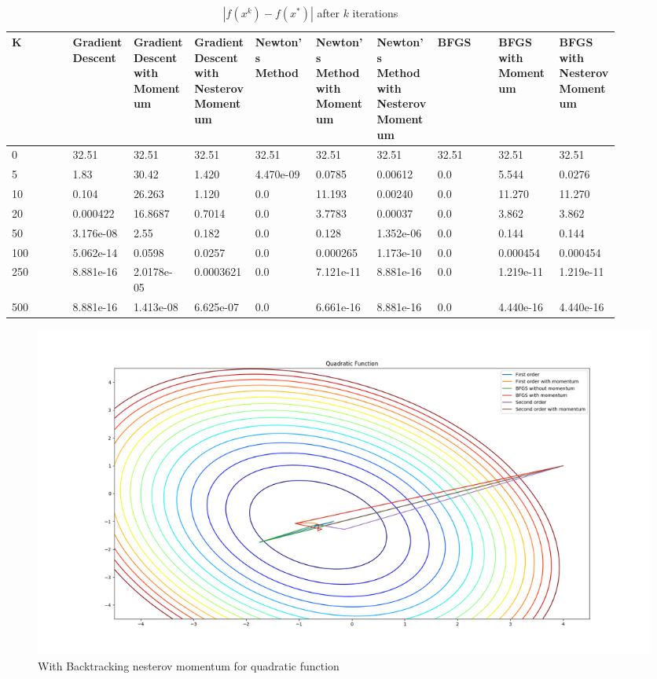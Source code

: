 \documentclass{article}
\begin{document}
\begin{table}[H]
	\centering
	\caption{$ | f(x^k) - f(x^*) | $ after $k$ iterations}
	\label{Quadratic function table}
	\begin{tabular}{|l|p{0.1\linewidth}|p{0.1\linewidth}|p{0.1\linewidth}|p{0.1\linewidth}|p{0.1\linewidth}|p{0.1\linewidth}|p{0.1\linewidth}|p{0.1\linewidth}|p{0.1\linewidth}|}
		\hline
		K & Gradient Descent & Gradient Descent with Momentum & Gradient Descent with Nesterov Momentum & Newton's Method & Newton's Method with Momentum & Newton's Method with Nesterov Momentum & BFGS & BFGS with Momentum & BFGS with Nesterov Momentum \\
		\hline
		0 & 32.51 & 32.51 & 32.51 & 32.51 & 32.51 & 32.51 & 32.51 & 32.51 & 32.51 \\
		\hline
		5 & 1.83 & 30.42 & 1.420 & 4.470e-09 & 0.0785 & 0.00612 & 0.0 & 5.544 & 0.0276 \\
		\hline
		10 & 0.104 & 26.263 & 1.120 & 0.0 & 11.193 & 0.00240 & 0.0 & 11.270 & 11.270 \\
		\hline
		20 & 0.000422 & 16.8687 & 0.7014 & 0.0 & 3.7783 & 0.00037 & 0.0 & 3.862 & 3.862 \\
		\hline
		50 & 3.176e-08 & 2.55 & 0.182 & 0.0 & 0.128 & 1.352e-06 & 0.0 & 0.144 & 0.144 \\
		\hline
		100 & 5.062e-14 & 0.0598 & 0.0257 & 0.0 & 0.000265 & 1.173e-10 & 0.0 & 0.000454 & 0.000454 \\
		\hline
		250 & 8.881e-16 & 2.0178e-05 & 0.0003621 & 0.0 & 7.121e-11 & 8.881e-16 & 0.0 & 1.219e-11 & 1.219e-11 \\
		\hline
		500 & 8.881e-16 & 1.413e-08 & 6.625e-07 & 0.0 & 6.661e-16 & 8.881e-16 & 0.0 & 4.440e-16 & 4.440e-16 \\
		\hline
	\end{tabular}
\end{table}

\begin{figure}[H]
	\includegraphics[width=\linewidth]{../Images/quadraticnesterovbacktrack.png}
	\caption{With Backtracking nesterov momentum for quadratic function}
	\label{fig:With Backtracking nesterov momentum for quadratic function}
\end{figure}
\end{document}
